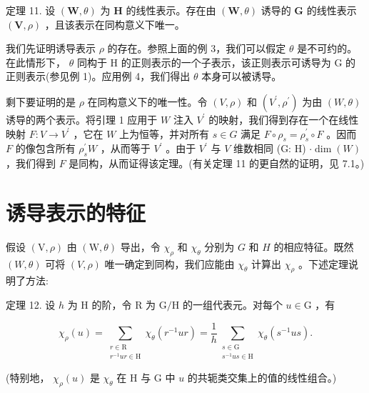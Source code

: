 \documentclass[10pt]{article}
\begin{document}
定理 11. 设 \(\left( {\mathbf{W},\theta }\right)\) 为 \(\mathbf{H}\) 的线性表示。存在由 \(\left( {\mathbf{W},\theta }\right)\) 诱导的 \(\mathbf{G}\) 的线性表示 \(\left( {\mathbf{V},\rho }\right)\) ，且该表示在同构意义下唯一。

我们先证明诱导表示 \(\rho\) 的存在。参照上面的例 3，我们可以假定 \(\theta\) 是不可约的。在此情形下， \(\theta\) 同构于 H 的正则表示的一个子表示，该正则表示可诱导为 G 的正则表示(参见例 1)。应用例 4，我们得出 \(\theta\) 本身可以被诱导。

剩下要证明的是 \(\rho\) 在同构意义下的唯一性。令 \(\left( {V,\rho }\right)\) 和 \(\left( {{V}^{\prime },{\rho }^{\prime }}\right)\) 为由 \(\left( {W,\theta }\right)\) 诱导的两个表示。将引理 1 应用于 \(W\) 注入 \({V}^{\prime }\) 的映射，我们得到存在一个在线性映射 \(F : V \rightarrow  {V}^{\prime }\) ，它在 \(W\) 上为恒等，并对所有 \(s \in  G\) 满足 \(F \circ  {\rho }_{s} = {\rho }_{s}^{\prime } \circ  F\) 。因而 \(F\) 的像包含所有 \({\rho }_{s}^{\prime }W\) ，从而等于 \({V}^{\prime }\) 。由于 \({V}^{\prime }\) 与 \(V\) 维数相同 (G: H) \(\cdot  \dim \left( W\right)\) ，我们得到 \(F\) 是同构，从而证得该定理。(有关定理 11 的更自然的证明，见 7.1。)

\section*{诱导表示的特征}

假设 \(\left( {\mathrm{V},\rho }\right)\) 由 \(\left( {\mathrm{W},\theta }\right)\) 导出，令 \({\chi }_{\rho }\) 和 \({\chi }_{\theta }\) 分别为 \(G\) 和 \(H\) 的相应特征。既然 \(\left( {W,\theta }\right)\) 可将 \(\left( {V,\rho }\right)\) 唯一确定到同构，我们应能由 \({\chi }_{\theta }\) 计算出 \({\chi }_{\rho }\) 。下述定理说明了方法:

定理 12. 设 \(h\) 为 \(\mathrm{H}\) 的阶，令 \(\mathrm{R}\) 为 \(\mathrm{G}/\mathrm{H}\) 的一组代表元。对每个 \(u \in  \mathrm{G}\) ，有

\[
{\chi }_{\rho }\left( u\right)  = \mathop{\sum }\limits_{\substack{{r \in  \mathrm{R}} \\  {{r}^{-1}{ur} \in  \mathrm{H}} }}{\chi }_{\theta }\left( {{r}^{-1}{ur}}\right)  = \frac{1}{h}\mathop{\sum }\limits_{\substack{{s \in  \mathrm{G}} \\  {{s}^{-1}{us} \in  \mathrm{H}} }}{\chi }_{\theta }\left( {{s}^{-1}{us}}\right) .
\]

(特别地， \({\chi }_{\rho }\left( u\right)\) 是 \({\chi }_{\theta }\) 在 \(\mathrm{H}\) 与 G 中 \(u\) 的共轭类交集上的值的线性组合。)
\end{document}
